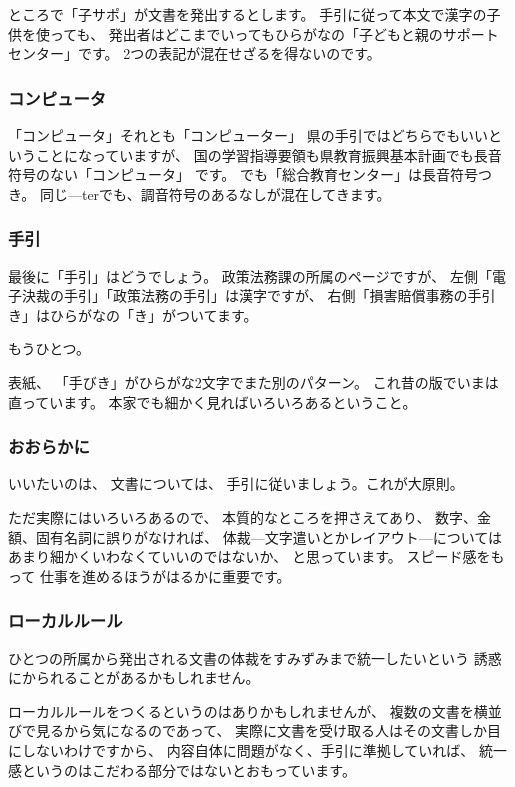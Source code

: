 \documentclass[uplatex,jis2004,dvipdfmx,12pt]{jsarticle}
\begin{document}
ところで「子サポ」が文書を発出するとします。
手引に従って本文で漢字の子供を使っても、
発出者はどこまでいってもひらがなの「子どもと親のサポートセンター」です。
2つの表記が混在せざるを得ないのです。

\subsubsection{コンピュータ}
「コンピュータ」それとも「コンピューター」
県の手引ではどちらでもいいということになっていますが、
国の学習指導要領も県教育振興基本計画でも長音符号のない「コンピュータ」
です。
でも「総合教育センター」は長音符号つき。
同じ---terでも、調音符号のあるなしが混在してきます。

\subsubsection{手引}
最後に「手引」はどうでしょう。
政策法務課の所属のページですが、
左側「電子決裁の手引」「政策法務の手引」は漢字ですが、
右側「損害賠償事務の手引き」はひらがなの「き」がついてます。


もうひとつ。

表紙、
「手びき」がひらがな2文字でまた別のパターン。
これ昔の版でいまは直っています。
本家でも細かく見ればいろいろあるということ。


\subsubsection{おおらかに}
いいたいのは、
文書については、
手引に従いましょう。これが大原則。

ただ実際にはいろいろあるので、
本質的なところを押さえてあり、
数字、金額、固有名詞に誤りがなければ、
体裁---文字遣いとかレイアウト---については
あまり細かくいわなくていいのではないか、
と思っています。
スピード感をもって
仕事を進めるほうがはるかに重要です。


\subsubsection{ローカルルール}

ひとつの所属から発出される文書の体裁をすみずみまで統一したいという
誘惑にかられることがあるかもしれません。

ローカルルールをつくるというのはありかもしれませんが、
複数の文書を横並びで見るから気になるのであって、
実際に文書を受け取る人はその文書しか目にしないわけですから、
内容自体に問題がなく、手引に準拠していれば、
統一感というのはこだわる部分ではないとおもっています。
\end{document}
